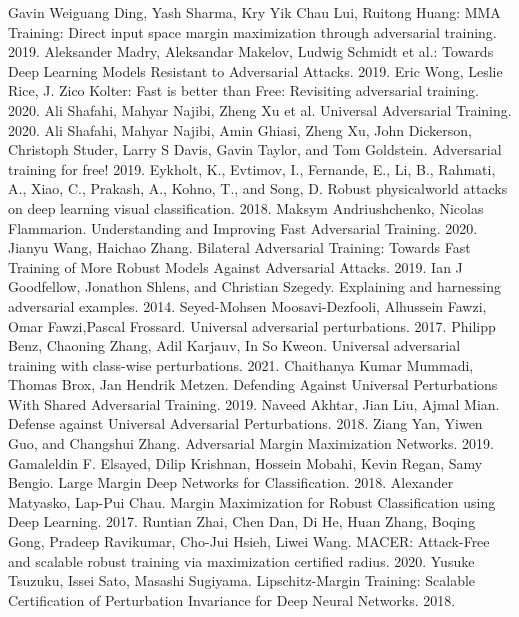 \documentclass[conference]{IEEEtran}
\begin{document}
\begin{thebibliography}{00}

   Gavin Weiguang Ding, Yash Sharma, Kry Yik Chau Lui, Ruitong Huang: MMA Training: Direct input space margin maximization through adversarial training. 2019.
   Aleksander Madry, Aleksandar Makelov, Ludwig Schmidt et al.: Towards Deep Learning Models Resistant to Adversarial Attacks. 2019.
   Eric Wong, Leslie Rice, J. Zico Kolter: Fast is better than Free: Revisiting adversarial training. 2020.
   Ali Shafahi, Mahyar Najibi, Zheng Xu et al. Universal Adversarial Training. 2020.
   Ali Shafahi, Mahyar Najibi, Amin Ghiasi, Zheng Xu, John Dickerson, Christoph Studer, Larry S Davis, Gavin Taylor, and Tom Goldstein. Adversarial training for free! 2019.
   Eykholt, K., Evtimov, I., Fernande, E., Li, B., Rahmati, A., Xiao, C., Prakash, A., Kohno, T., and Song, D. Robust physicalworld attacks on deep learning visual classification. 2018.
   Maksym Andriushchenko, Nicolas Flammarion. Understanding and Improving
  Fast Adversarial Training. 2020.
   Jianyu Wang, Haichao Zhang. Bilateral Adversarial Training: Towards Fast Training of More Robust Models Against Adversarial Attacks. 2019.
   Ian J Goodfellow, Jonathon Shlens, and Christian Szegedy. Explaining and harnessing adversarial examples. 2014.
   Seyed-Mohsen Moosavi-Dezfooli, Alhussein Fawzi, Omar Fawzi,Pascal Frossard. Universal adversarial perturbations. 2017.
   Philipp Benz, Chaoning Zhang, Adil Karjauv, In So Kweon. Universal adversarial training with class-wise perturbations. 2021.
   Chaithanya Kumar Mummadi, Thomas Brox, Jan Hendrik Metzen. Defending Against Universal Perturbations With Shared Adversarial Training. 2019.
   Naveed Akhtar, Jian Liu, Ajmal Mian. Defense against Universal Adversarial Perturbations. 2018.
   Ziang Yan, Yiwen Guo, and Changshui Zhang. Adversarial Margin Maximization Networks. 2019.
   Gamaleldin F. Elsayed, Dilip Krishnan, Hossein Mobahi, Kevin Regan, Samy Bengio. Large Margin Deep Networks for Classification. 2018.
   Alexander Matyasko, Lap-Pui Chau. Margin Maximization for Robust Classification using Deep Learning. 2017.
   Runtian Zhai, Chen Dan, Di He, Huan Zhang, Boqing Gong, Pradeep Ravikumar, Cho-Jui Hsieh, Liwei Wang. MACER: Attack-Free and scalable robust training via maximization certified radius. 2020.
   Yusuke Tsuzuku, Issei Sato, Masashi Sugiyama. Lipschitz-Margin Training: Scalable Certification of Perturbation Invariance for Deep Neural Networks. 2018.

\end{thebibliography}
\end{document}
